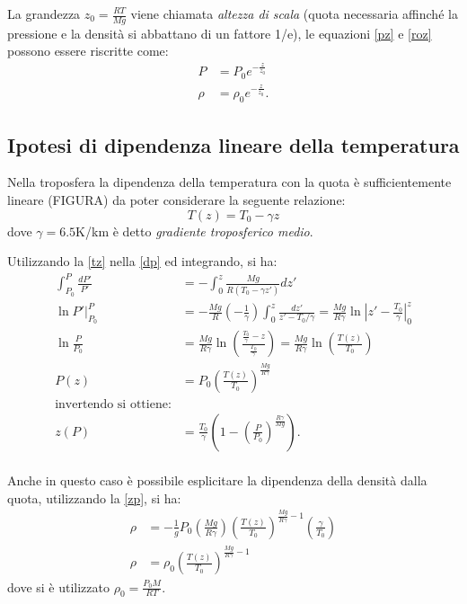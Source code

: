 La grandezza $z_0=\frac{RT}{Mg}$ viene chiamata \emph{altezza di scala} (quota necessaria affinché la pressione e la densità si abbattano di un fattore 1/e), le equazioni \eqref{pz} e \eqref{roz} possono essere riscritte come:
\begin{align}
P&=P_0e^{-\frac{z}{z_0}}\\
\rho&=\rho_0e^{-\frac{z}{z_0}}.
\end{align}

\subsection{Ipotesi di dipendenza lineare della temperatura}
Nella troposfera la dipendenza della temperatura con la quota è sufficientemente lineare (FIGURA) da poter considerare la seguente relazione:
\begin{equation}\label{tz}
	T(z)=T_0-\gamma z
\end{equation}
dove $\gamma=6.5$K/km è detto \emph{gradiente troposferico medio}.

Utilizzando la \eqref{tz} nella \eqref{dp} ed integrando, si ha:
\begin{align}
	\int_{P_0}^{P}\frac{dP'}{P'}&=-\int_{0}^{z}\frac{Mg}{R(T_0-\gamma z')}dz'\\
	\ln P'\Big|_{P_0}^P&=-\frac{Mg}{R}\left( -\frac{1}{\gamma}\right)\int_{0}^{z}\frac{dz'}{z'-T_0/\gamma}=\frac{Mg}{R\gamma}\ln\left|z'-\frac{T_0}{\gamma}\right|^z_0\\
	\ln\frac{P}{P_0}&=\frac{Mg}{R\gamma}\ln\left(\frac{\frac{T_0}{\gamma}-z}{\frac{T_0}{\gamma}}\right)=\frac{Mg}{R\gamma}\ln\left(\frac{T(z)}{T_0}\right)\\
	P(z)&=P_0\left(\frac{T(z)}{T_0}\right)^{\frac{Mg}{R\gamma}}\\
\text{invertendo si ottiene:}\nonumber\\
	z(P)&=\frac{T_0}{\gamma}\left(1-\left(\frac{P}{P_0}\right)^{\frac{R\gamma}{Mg}}\right).\label{zp}
\end{align}\\

Anche in questo caso è possibile esplicitare la dipendenza della densità dalla quota, utilizzando la \eqref{zp}, si ha:
\begin{align}
	\rho&=-\frac{1}{g}P_0\left(\frac{Mg}{R\gamma}\right)\left(\frac{T(z)}{T_0}\right)^{\frac{Mg}{R\gamma}-1}\left(\frac{\gamma}{T_0}\right)\\
	\rho&=\rho_0\left(\frac{T(z)}{T_0}\right)^{\frac{Mg}{R\gamma}-1}\label{rho}
\end{align}
dove si è utilizzato $\rho_0=\frac{P_0M}{RT}$.

